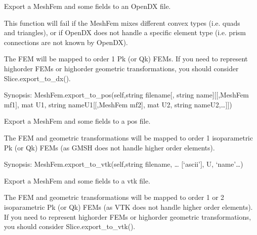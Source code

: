 \documentclass[a4paper,11pt,english]{sphinxmanual}
\begin{document}
\begin{fulllineitems}
\begin{fulllineitems}
Export a MeshFem and some fields to an OpenDX file.

This function will fail if the MeshFem mixes different convex types
(i.e. quads and triangles), or if OpenDX does not handle a specific
element type (i.e. prism connections are not known by OpenDX).

The FEM will be mapped to order 1 Pk (or Qk) FEMs. If you need to
represent high\sphinxhyphen{}order FEMs or high\sphinxhyphen{}order geometric transformations,
you should consider Slice.export\_to\_dx().

\end{fulllineitems}


\begin{fulllineitems}
\label{\detokenize{python/cmdref_MeshFem:getfem.MeshFem.export_to_pos}}
Synopsis: MeshFem.export\_to\_pos(self,string filename{[}, string name{]}{[}{[},MeshFem mf1{]}, mat U1, string nameU1{[}{[},MeshFem mf2{]}, mat U2, string nameU2,…{]}{]})

Export a MeshFem and some fields to a pos file.

The FEM and geometric transformations will be mapped to order 1
isoparametric Pk (or Qk) FEMs (as GMSH does not handle higher
order elements).

\end{fulllineitems}


\begin{fulllineitems}
\label{\detokenize{python/cmdref_MeshFem:getfem.MeshFem.export_to_vtk}}
Synopsis: MeshFem.export\_to\_vtk(self,string filename, … {[}‘ascii’{]}, U, ‘name’…)

Export a MeshFem and some fields to a vtk file.

The FEM and geometric transformations will be mapped to order 1
or 2 isoparametric Pk (or Qk) FEMs (as VTK does not handle higher
order elements). If you need to represent high\sphinxhyphen{}order FEMs or
high\sphinxhyphen{}order geometric transformations, you should consider
Slice.export\_to\_vtk().


\end{fulllineitems}
\end{fulllineitems}
\end{document}

